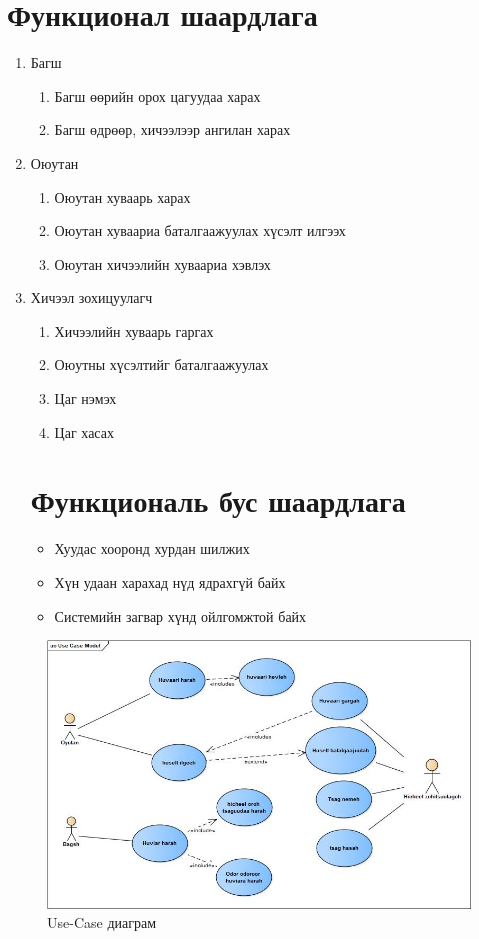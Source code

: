 \documentclass[12pt]{article}
\begin{document}
\section{Функционал шаардлага}
\begin{enumerate}
	\item Багш
	\begin{enumerate}
		\item Багш өөрийн орох цагуудаа харах
		\item Багш өдрөөр, хичээлээр ангилан харах
	\end{enumerate}
	\item Оюутан
	\begin{enumerate}
		\item Оюутан хуваарь харах
		\item Оюутан хуваариа баталгаажуулах хүсэлт илгээх
		\item Оюутан хичээлийн хуваариа хэвлэх
	\end{enumerate}
	\item Хичээл зохицуулагч
	\begin{enumerate}
		\item Хичээлийн хуваарь гаргах
		\item Оюутны хүсэлтийг баталгаажуулах
		\item Цаг нэмэх 
		\item Цаг хасах
	\end{enumerate}
\section{Функциональ бус шаардлага}	
\begin{itemize}
	\item Хуудас хооронд хурдан шилжих
	\item Хүн удаан харахад нүд ядрахгүй байх
	\item Системийн загвар хүнд ойлгомжтой байх	
\end{itemize}
\end{enumerate}
\begin{figure}
	\centering
	\includegraphics[width=1\textwidth]{diagrams/use-case}
	\caption{Use-Case диаграм}
	\label{fig:use-case-model}
\end{figure}
	
\end{document}
